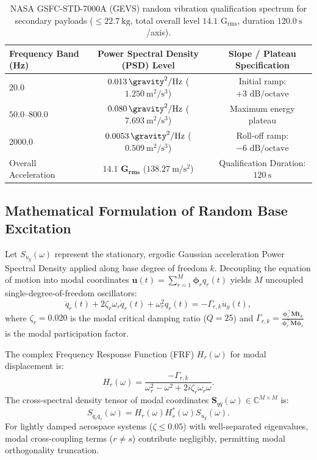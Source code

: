 \begin{table}[htbp]
\centering
\caption{NASA GSFC-STD-7000A (GEVS) random vibration qualification spectrum for secondary payloads ($\le \SI{22.7}{\kilo\gram}$, total overall level $14.1\text{ G}_{\text{rms}}$, duration $\SI{120.0}{\second}$/axis).}
\label{tab:ch4_gevs_profile}
\begin{tabular*}{\textwidth}{@{\extracolsep{\fill}}lcc@{}}
\toprule
Frequency Band (\si{\hertz}) & Power Spectral Density (PSD) Level & Slope / Plateau Specification \\
\midrule
$20.0$ & $\SI{0.013}{\gravity^2/\hertz}$ ($\SI{1.250}{\meter^2/\second^3}$) & Initial ramp: $+3\text{ dB/octave}$ \\
$50.0\text{--}800.0$ & $\SI{0.080}{\gravity^2/\hertz}$ ($\SI{7.693}{\meter^2/\second^3}$) & Maximum energy plateau \\
$2000.0$ & $\SI{0.0053}{\gravity^2/\hertz}$ ($\SI{0.509}{\meter^2/\second^3}$) & Roll-off ramp: $-6\text{ dB/octave}$ \\
\midrule
Overall Acceleration & $\mathbf{14.1\text{ G}_{\text{rms}}}$ ($\SI{138.27}{\meter/\second^2}$) & Qualification Duration: $\SI{120}{\second}$ \\
\bottomrule
\end{tabular*}
\end{table}

\subsection{Mathematical Formulation of Random Base Excitation}

Let $S_{\ddot{u}_g}(\omega)$ represent the stationary, ergodic Gaussian acceleration Power Spectral Density applied along base degree of freedom $k$. Decoupling the equation of motion into modal coordinates $\mathbf{u}(t) = \sum_{r=1}^M \boldsymbol{\phi}_r q_r(t)$ yields $M$ uncoupled single-degree-of-freedom oscillators:
\begin{equation}
\ddot{q}_r(t) + 2 \zeta_r \omega_r \dot{q}_r(t) + \omega_r^2 q_r(t) = -\Gamma_{r,k} \ddot{u}_g(t),
\label{eq:modal_sdof}
\end{equation}
where $\zeta_r = 0.020$ is the modal critical damping ratio ($Q = 25$) and $\Gamma_{r,k} = \frac{\boldsymbol{\phi}_r^\top \mathbf{M} \mathbf{t}_k}{\boldsymbol{\phi}_r^\top \mathbf{M} \boldsymbol{\phi}_r}$ is the modal participation factor.

The complex Frequency Response Function (FRF) $H_r(\omega)$ for modal displacement is:
\begin{equation}
H_r(\omega) = \frac{-\Gamma_{r,k}}{\omega_r^2 - \omega^2 + 2 i \zeta_r \omega_r \omega}.
\label{eq:frf_modal}
\end{equation}
The cross-spectral density tensor of modal coordinates $\mathbf{S}_{qq}(\omega) \in \mathbb{C}^{M \times M}$ is:
\begin{equation}
S_{q_r q_s}(\omega) = H_r(\omega) H_s^*(\omega) S_{\ddot{u}_g}(\omega).
\label{eq:cross_spectral_modal}
\end{equation}
For lightly damped aerospace systems ($\zeta \le 0.05$) with well-separated eigenvalues, modal cross-coupling terms ($r \ne s$) contribute negligibly, permitting modal orthogonality truncation. 

